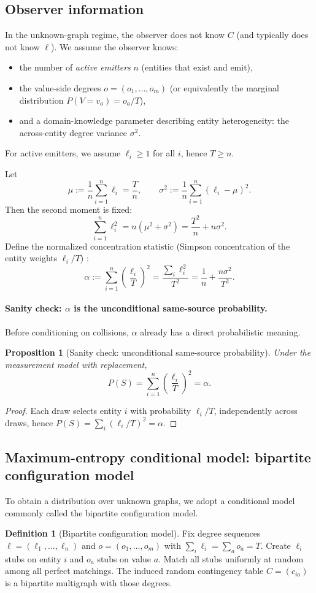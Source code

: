 \documentclass[11pt]{article}
\newcommand{\1}{\mathbf{1}}
\theoremstyle{plain}
\newtheorem{proposition}{Proposition}
\theoremstyle{definition}
\newtheorem{definition}{Definition}
\begin{document}
\subsection{Observer information}
In the unknown-graph regime, the observer does not know $C$ (and typically does not know $\ell$).
We assume the observer knows:
\begin{itemize}[leftmargin=*]
\item the number of \emph{active emitters} $n$ (entities that exist and emit),
\item the value-side degrees $o=(o_1,\dots,o_m)$ (or equivalently the marginal distribution $P(V=v_a)=o_a/T$),
\item and a domain-knowledge parameter describing entity heterogeneity: the across-entity degree variance $\sigma^2$.
\end{itemize}
For active emitters, we assume $\ell_i\ge 1$ for all $i$, hence $T\ge n$.

Let
\[
\mu := \frac{1}{n}\sum_{i=1}^n \ell_i = \frac{T}{n},
\qquad
\sigma^2 := \frac{1}{n}\sum_{i=1}^n (\ell_i-\mu)^2.
\]
Then the second moment is fixed:
\[
\sum_{i=1}^n \ell_i^2 = n(\mu^2+\sigma^2) = \frac{T^2}{n} + n\sigma^2.
\]
Define the normalized concentration statistic (Simpson concentration of the entity weights $\ell_i/T$) \cite{simpson1949}:
\[
\alpha := \sum_{i=1}^n \left(\frac{\ell_i}{T}\right)^2
=
\frac{\sum_i \ell_i^2}{T^2}
=
\boxed{
\frac{1}{n} + \frac{n\sigma^2}{T^2}.
}
\]

\paragraph{Sanity check: \texorpdfstring{$\alpha$}{alpha} is the unconditional same-source probability.}
Before conditioning on collisions, $\alpha$ already has a direct probabilistic meaning.
\begin{proposition}[Sanity check: unconditional same-source probability]
\label{prop:sanity}
Under the measurement model with replacement,
\[
\boxed{
P(S) = \sum_{i=1}^n \left(\frac{\ell_i}{T}\right)^2 = \alpha.
}
\]
\end{proposition}
\begin{proof}
Each draw selects entity $i$ with probability $\ell_i/T$, independently across draws, hence
$P(S)=\sum_i (\ell_i/T)^2=\alpha$.
\end{proof}

\subsection{Maximum-entropy conditional model: bipartite configuration model}
To obtain a distribution over unknown graphs, we adopt a conditional model commonly called the bipartite configuration model.
\begin{definition}[Bipartite configuration model]
Fix degree sequences $\ell=(\ell_1,\dots,\ell_n)$ and $o=(o_1,\dots,o_m)$ with $\sum_i\ell_i=\sum_a o_a=T$.
Create $\ell_i$ stubs on entity $i$ and $o_a$ stubs on value $a$.
Match all stubs uniformly at random among all perfect matchings.
The induced random contingency table $C=(c_{ia})$ is a bipartite multigraph with those degrees.
\end{definition}
\end{document}
